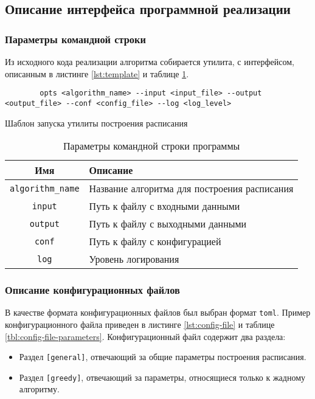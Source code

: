 \subsection{Описание интерфейса программной реализации}
\subsubsection{Параметры командной строки}
Из исходного кода реализации алгоритма собирается утилита, с интерфейсом, описанным в листинге \ref{lst:template} и таблице \ref{tbl:command-line-parameters}. 
\begin{listing}[!htbp]
    \begin{verbatim}
        opts <algorithm_name> --input <input_file> --output <output_file> --conf <config_file> --log <log_level>
    \end{verbatim}
    \caption{Шаблон запуска утилиты построения расписания}
    \label{lst:template}
\end{listing}

\begin{table}[!htbp]
    \centering
    \begin{tabularx}{\textwidth}{|c|X|}
        \hline
        Имя                      & Описание                                     \\
        \hline
        \texttt{algorithm\_name} & Название алгоритма для построения расписания \\
        \hline
        \texttt{input}           & Путь к файлу с входными данными              \\
        \hline
        \texttt{output}          & Путь к файлу с выходными данными             \\
        \hline
        \texttt{conf}            & Путь к файлу с конфигурацией                 \\
        \hline
        \texttt{log}             & Уровень логирования                          \\
        \hline
    \end{tabularx}
    \caption{Параметры командной строки программы}
    \label{tbl:command-line-parameters}
\end{table}
\subsubsection{Описание конфигурационных файлов}
В качестве формата конфигурационных файлов был выбран формат \texttt{toml}. Пример конфигурационного файла приведен в листинге \ref{lst:config-file} и таблице \ref{tbl:config-file-parameters}. Конфигурационный файл содержит два раздела:
\begin{itemize}
    \item Раздел \texttt{[general]}, отвечающий за общие параметры построения расписания.
    \item Раздел \texttt{[greedy]}, отвечающий за параметры, относящиеся только к жадному алгоритму.
\end{itemize}

